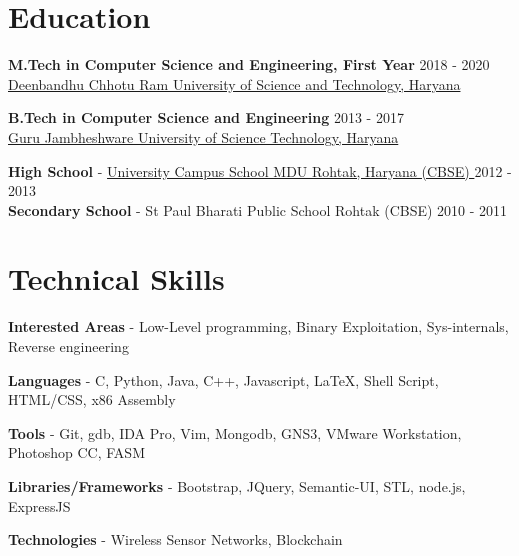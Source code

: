\documentclass[margin, centered]{res}
\begin{document}
\begin{resume}

\section{Education}

\textbf{M.Tech in Computer Science and Engineering, First Year} \hfill 2018 - 2020 \\
\href{http://dcrustm.ac.in//}{Deenbandhu Chhotu Ram University of Science and Technology, Haryana}

\textbf{B.Tech in Computer Science and Engineering} \hfill 2013 - 2017 \\
\href{http://www.gjust.ac.in/}{Guru Jambheshware University of Science Technology, Haryana}

\textbf{High School} - \href{http://www.mdurohtak.ac.in/info/campusschool.html/} {University Campus School MDU Rohtak, Haryana (CBSE) } \hfill 2012 - 2013 \\
\textbf{Secondary School} - St Paul Bharati Public School Rohtak (CBSE)  \hfill 2010 - 2011 \\
\vspace{3mm}
\section{Technical \hspace{2mm} Skills}
\textbf{Interested Areas} - Low-Level programming, Binary Exploitation, Sys-internals, Reverse engineering 

\textbf{Languages} - C, Python, Java, C++, Javascript, \LaTeX, Shell Script, HTML/CSS, x86 Assembly

\textbf{Tools} - Git, gdb, IDA Pro, Vim, Mongodb, GNS3, VMware Workstation, Photoshop CC, FASM

\textbf{Libraries/Frameworks} - Bootstrap, JQuery, Semantic-UI, STL, node.js, ExpressJS

\textbf{Technologies} - Wireless Sensor Networks, Blockchain
\vspace{4mm}



\end{resume}
\end{document}
